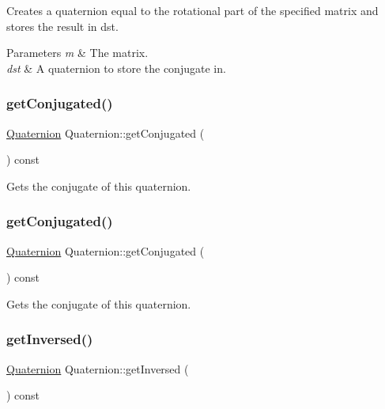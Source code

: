 Creates a quaternion equal to the rotational part of the specified matrix and stores the result in dst.


\begin{DoxyParams}{Parameters}
{\em m} & The matrix. \\
\hline
{\em dst} & A quaternion to store the conjugate in. \\
\hline
\end{DoxyParams}
\mbox{\label{classQuaternion_a340e18206128073f5457258284386974}} 
\subsubsection{\texorpdfstring{get\+Conjugated()}{getConjugated()}\hspace{0.1cm}{\footnotesize\ttfamily [1/2]}}
{\footnotesize\ttfamily \hyperlink{classQuaternion}{Quaternion} Quaternion\+::get\+Conjugated (\begin{DoxyParamCaption}{ }\end{DoxyParamCaption}) const}

Gets the conjugate of this quaternion. \mbox{\label{classQuaternion_a340e18206128073f5457258284386974}} 
\subsubsection{\texorpdfstring{get\+Conjugated()}{getConjugated()}\hspace{0.1cm}{\footnotesize\ttfamily [2/2]}}
{\footnotesize\ttfamily \hyperlink{classQuaternion}{Quaternion} Quaternion\+::get\+Conjugated (\begin{DoxyParamCaption}{ }\end{DoxyParamCaption}) const}

Gets the conjugate of this quaternion. \mbox{\label{classQuaternion_acab26dc0925530cf5d58c92e5fbb9e5a}} 
\subsubsection{\texorpdfstring{get\+Inversed()}{getInversed()}\hspace{0.1cm}{\footnotesize\ttfamily [1/2]}}
{\footnotesize\ttfamily \hyperlink{classQuaternion}{Quaternion} Quaternion\+::get\+Inversed (\begin{DoxyParamCaption}{ }\end{DoxyParamCaption}) const}

